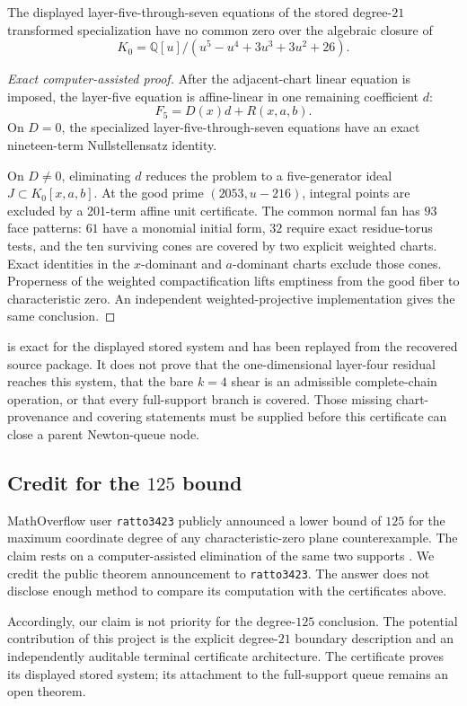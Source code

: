 \begin{theorem}
\label{thm:stored-terminal-layer-seven}
The displayed layer-five-through-seven equations of the stored
degree-\(21\) transformed specialization have no common zero over the
algebraic closure of
\[
K_0=\mathbb Q[u]/(u^5-u^4+3u^3+3u^2+26).
\]
\end{theorem}

\begin{proof}[Exact computer-assisted proof]
After the adjacent-chart linear equation is imposed, the layer-five
equation is affine-linear in one remaining coefficient \(d\):
\[
F_5=D(x)d+R(x,a,b).
\]
On \(D=0\), the specialized layer-five-through-seven equations have an
exact nineteen-term Nullstellensatz identity.

On \(D\ne0\), eliminating \(d\) reduces the problem to a five-generator
ideal \(J\subset K_0[x,a,b]\).  At the good prime
\((2053,u-216)\), integral points are excluded by a 201-term affine unit
certificate.  The common normal fan has \(93\) face patterns: \(61\) have a
monomial initial form, \(32\) require exact residue-torus tests, and the ten
surviving cones are covered by two explicit weighted charts.  Exact
identities in the \(x\)-dominant and \(a\)-dominant charts exclude those
cones.  Properness of the weighted compactification lifts emptiness from the
good fiber to characteristic zero.  An independent weighted-projective
implementation gives the same conclusion.
\end{proof}

 is exact for the displayed stored
system and has been replayed from the recovered source package.  It does not
prove that the one-dimensional layer-four residual reaches this system, that
the bare \(k=4\) shear is an admissible complete-chain operation, or that
every full-support branch is covered.  Those missing chart-provenance and
covering statements must be supplied before this certificate can close a
parent Newton-queue node.

\subsection{Credit for the \texorpdfstring{\(125\)}{125} bound}

MathOverflow user \texttt{ratto3423} publicly announced a lower bound of
\(125\) for the maximum coordinate degree of any characteristic-zero plane
counterexample.  The claim rests on a computer-assisted elimination of the
same two supports \cite{ratto3423degree125}.  We credit the public theorem
announcement to \texttt{ratto3423}.  The answer does not disclose enough
method to compare its computation with the certificates above.

Accordingly, our claim is not priority for the degree-\(125\) conclusion.
The potential contribution of this project is the explicit degree-\(21\)
boundary description and an independently auditable terminal certificate
architecture.  The certificate proves its displayed stored system; its
attachment to the full-support queue remains an open theorem.
